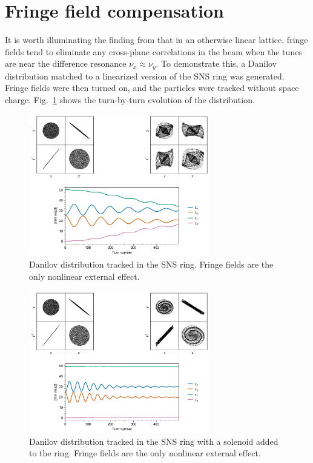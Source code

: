 \section{Fringe field compensation}

It is worth illuminating the finding from \cite{Holmes2018} that in an otherwise linear lattice, fringe fields tend to eliminate any cross-plane correlations in the beam when the tunes are near the difference resonance $\nu_x \approx \nu_y$. To demonstrate this, a Danilov distribution matched to a linearized version of the SNS ring was generated. Fringe fields were then turned on, and the particles were tracked without space charge. Fig.~\ref{fig:fringe_a} shows the turn-by-turn evolution of the distribution.

\begin{figure}[!p]
    \centering
    \includegraphics[width=0.7\textwidth]{Images/chapter3/fringe.png}
    \caption{Danilov distribution tracked in the SNS ring. Fringe fields are the only nonlinear external effect.}
    \label{fig:fringe_a}
    \vspace*{3cm}
\end{figure}

\begin{figure}[!p]
    \centering
    \includegraphics[width=0.7\textwidth]{Images/chapter3/fringe_solenoid.png}
    \caption{Danilov distribution tracked in the SNS ring with a solenoid added to the ring. Fringe fields are the only nonlinear external effect.}
    \label{fig:fringe_b}
    \vspace*{3cm}
\end{figure}

